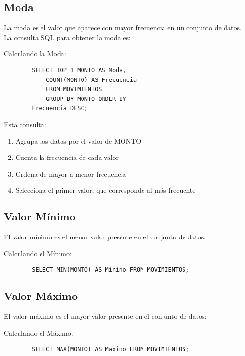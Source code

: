\subsection{Moda}
La moda es el valor que aparece con mayor frecuencia en un conjunto de datos. La consulta SQL para obtener la moda es:
\begin{comando} {Calculando la Moda:}
	\begin{verbatim}
		SELECT TOP 1 MONTO AS Moda,
			COUNT(MONTO) AS Frecuencia 
			FROM MOVIMIENTOS 
			GROUP BY MONTO ORDER BY
		Frecuencia DESC;
	\end{verbatim}
\end{comando}
Esta consulta:
\begin{enumerate}
	\item Agrupa los datos por el valor de MONTO
	\item Cuenta la frecuencia de cada valor
	\item Ordena de mayor a menor frecuencia
	\item Selecciona el primer valor, que corresponde al más frecuente
\end{enumerate}
\subsection{Valor Mínimo}
El valor mínimo es el menor valor presente en el conjunto de datos:
\begin{comando}{Calculando el Mínimo:}
	\begin{verbatim}
		SELECT MIN(MONTO) AS Minimo FROM MOVIMIENTOS;
	\end{verbatim}
\end{comando}
\subsection{Valor Máximo}
El valor máximo es el mayor valor presente en el conjunto de datos:
\begin{comando}{Calculando el Máximo:}
	\begin{verbatim}
		SELECT MAX(MONTO) AS Maximo FROM MOVIMIENTOS;
	\end{verbatim}
\end{comando}

